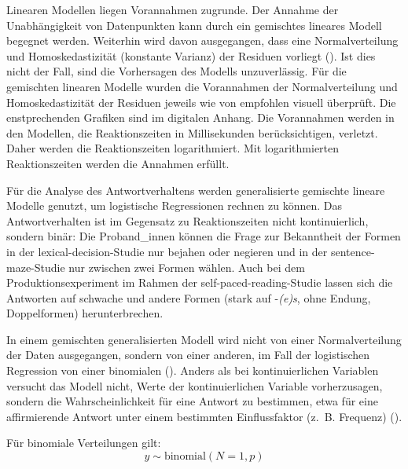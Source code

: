 Linearen Modellen liegen Vorannahmen zugrunde. Der Annahme der Unabhängigkeit von Datenpunkten kann durch ein gemischtes lineares Modell begegnet werden. Weiterhin wird davon ausgegangen, dass eine Normalverteilung und Homoskedastizität (konstante Varianz) der Residuen vorliegt (\cite[74--75]{Winter.2020}). Ist dies nicht der Fall, sind die Vorhersagen des Modells unzuverlässig. Für die gemischten linearen Modelle wurden die Vorannahmen der Normalverteilung und Homoskedastizität der Residuen jeweils wie von \textcite[109]{Winter.2020} empfohlen visuell überprüft. Die enstprechenden Grafiken sind im digitalen Anhang. Die Vorannahmen werden in den Modellen, die Reaktionszeiten in Millisekunden berücksichtigen, verletzt. Daher werden die Reaktionszeiten logarithmiert. Mit logarithmierten Reaktionszeiten werden die Annahmen erfüllt.  

Für die Analyse des Antwortverhaltens werden generalisierte gemischte lineare Modelle genutzt, um logistische Regressionen rechnen zu können. Das Antwortverhalten ist im Gegensatz zu Reaktionszeiten nicht kontinuierlich, sondern binär: Die Proband\_innen können die Frage zur Bekanntheit der Formen in der lexical-decision-Studie nur bejahen oder negieren und in der sentence-maze-Studie nur zwischen zwei Formen wählen. Auch bei dem Produktions\-experiment im Rahmen der self-paced-reading-Studie lassen sich die Antworten auf schwache und andere Formen (stark auf -\textit{(e)s}, ohne Endung, Doppelformen)  herunterbrechen.

 

In einem gemischten generalisierten Modell wird nicht von einer Normalverteilung der Daten ausgegangen, sondern von einer anderen, im Fall der logistischen Regression von einer binomialen (\cite[200]{Winter.2020}). Anders als bei kontinuierlichen Variablen versucht das Modell nicht, Werte der kontinuierlichen Variable vorherzusagen, sondern die Wahrscheinlichkeit für eine Antwort zu bestimmen, etwa für eine affirmierende Antwort unter einem bestimmten Einflussfaktor (z.~B. Frequenz) (\cite[200--201]{Winter.2020}).


Für binomiale Verteilungen gilt:
\[ y \sim \text{binomial} (N=1,p)\]

